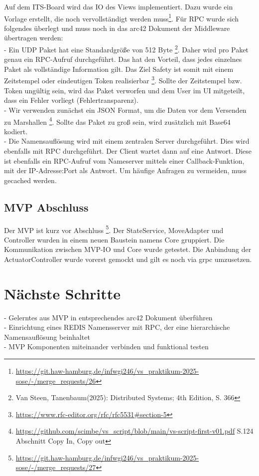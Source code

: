\documentclass{article}
\begin{document}
Auf dem ITS-Board wird das IO des Views implementiert. Dazu wurde ein Vorlage erstellt, die noch vervollständigt werden muss\footnote{\url{https://git.haw-hamburg.de/infwgi246/vs_praktikum-2025-sose/-/merge_requests/26}}.
Für RPC wurde sich folgendes überlegt und muss noch in das arc42 Dokument der Middleware übertragen werden:\\
- Ein UDP Paket hat eine Standardgröße von 512 Byte \footnote{Van Steen, Tanenbaum(2025): Distributed Systems; 4th Edition, S. 366}. Daher wird pro Paket genau ein RPC-Aufruf durchgeführt.
Das hat den Vorteil, dass jedes einzelnes Paket als vollständige Information gilt. Das Ziel Safety ist somit mit einem Zeitstempel oder eindeutigen Token realisierbar \footnote{\url{https://www.rfc-editor.org/rfc/rfc5531\#section-5}}. Sollte der Zeitstempel bzw. Token ungültig sein, wird das Paket verworfen und dem User im UI mitgeteilt, dass ein Fehler vorliegt (Fehlertransparenz).\\
- Wir verwenden zunächst ein JSON Format, um die Daten vor dem Versenden zu Marshallen \footnote{\url{https://github.com/scimbe/vs_script/blob/main/vs-script-first-v01.pdf} S.124 Abschnitt Copy In, Copy out}. Sollte das Paket zu groß sein, wird zusätzlich mit Base64 kodiert.\\
- Die Namensauflösung wird mit einem zentralen Server durchgeführt. Dies wird ebenfalls mit RPC durchgeführt. Der Client wartet dann auf eine Antwort. Diese ist ebenfalls ein RPC-Aufruf vom Nameserver mittels einer Callback-Funktion, mit der IP-Adresse:Port als Antwort. Um häufige Anfragen zu vermeiden, muss gecached werden. 

\subsection{MVP Abschluss}

Der MVP ist kurz vor Abschluss \footnote{\url{https://git.haw-hamburg.de/infwgi246/vs_praktikum-2025-sose/-/merge_requests/27}}.
Der StateService, MoveAdapter und Controller wurden in einem neuen Baustein namens Core gruppiert. 
Die Kommunikation zwischen MVP-IO und Core wurde getestet. Die Anbindung der ActuatorController wurde vorerst gemockt und gilt es noch via grpc umzusetzen.


\section{Nächste Schritte}
- Gelerntes aus MVP in entsprechendes arc42 Dokument überführen\\
- Einrichtung eines REDIS Namensserver mit RPC, der eine hierarchische Namensauflösung beinhaltet \\
- MVP Komponenten miteinander verbinden und funktional testen \\
\end{document}
